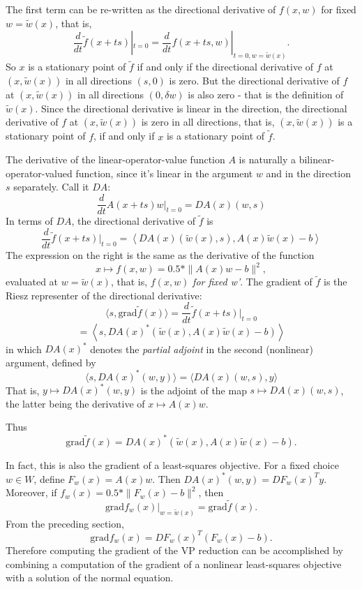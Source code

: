 The first term can be re-written as the directional derivative of $f(x,w)$ for fixed $w=\tilde{w}(x)$, that is,
$$
\frac{d}{dt}\tilde{f}(x+ts)|_{t=0} = \frac{d}{dt}f(x+ts,w)|_{t=0,w=\tilde{w}(x)}.
$$
So $x$ is a stationary point of $\tilde{f}$ if and only if the directional derivative of $f$ at $(x,\tilde{w}(x))$ in all directions $(s,0)$ is zero. But the directional derivative of $f$ at $(x,\tilde{w}(x))$ in all directions $(0,\delta w)$ is also zero - that is the definition of $\tilde{w}(x)$. Since the directional derivative is linear in the direction, the directional derivative of $f$ at $(x,\tilde{w}(x))$ is zero in all directions, that is, $(x,\tilde{w}(x))$ is a stationary point of $f$, if and only if $x$ is a stationary point of $\tilde{f}$. 

The derivative of the linear-operator-value function $A$ is naturally a bilinear-operator-valued function, since it's linear in the argument $w$ and in the direction $s$ separately. Call it $DA$:
$$
\frac{d}{dt}A(x+ts)w|_{t=0} = DA(x)(w,s)
$$ 
In terms of $DA$, the directional derivative of $\tilde{f}$ is
$$
\frac{d}{dt}\tilde{f}(x+ts)|_{t=0} = \left\langle DA(x)(\tilde{w}(x),s), A(x)\tilde{w}(x)-b\right\rangle 
$$
The expression on the right is the same as the derivative of the function
$$
x \mapsto f(x,w) = 0.5*\|A(x)w-b\|^2,
$$ 
evaluated at $w=\tilde{w}(x)$, that is, $f(x,w)$ {\em for fixed w'}. 
The gradient of $\tilde{f}$ is the Riesz representer of the directional derivative:
$$
\langle s, \mbox{grad} \tilde{f}(x)\rangle = \frac{d}{dt}\tilde{f}(x+ts)|_{t=0}
$$
$$
= \left\langle s, DA(x)^*(\tilde{w}(x),A(x)\tilde{w}(x)-b)\right\rangle 
$$
in which $DA(x)^*$ denotes the {\em partial adjoint} in the second (nonlinear) argument, defined by
$$
\langle s, DA(x)^*(w,y) \rangle = \langle DA(x)(w,s),y\rangle
$$
That is, $y \mapsto DA(x)^*(w,y)$ is the adjoint of the map $s \mapsto DA(x)(w,s)$, the latter being the derivative of $x \mapsto A(x)w$. 

Thus
$$
\mbox{grad} \tilde{f}(x) = DA(x)^*(\tilde{w}(x),A(x)\tilde{w}(x)-b).
$$

In fact, this is also the gradient of a least-squares objective.
For a fixed choice $w \in W$, define $F_w(x) = A(x)w$. Then $DA(x)^*(w,y) = DF_w(x)^Ty$. Moreover, if $f_w(x) = 0.5*\|F_w(x)-b\|^2$, then 
$$
\mbox{grad} f_w(x)|_{w=\tilde{w}(x)} =  \mbox{grad}\tilde{f}(x).
$$
From the preceding section,
$$
\mbox{grad} f_w(x) = DF_w(x)^T(F_w(x)-b).
$$ 
Therefore computing the gradient of the VP reduction can be accomplished by combining a computation of the gradient of a nonlinear least-squares objective with a solution of the normal equation.

